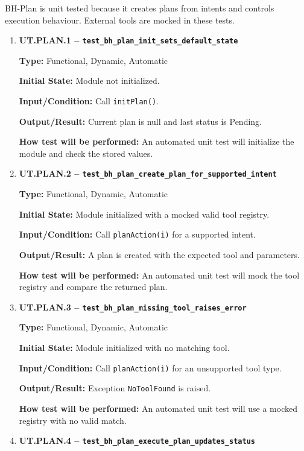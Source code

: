 \documentclass[12pt, titlepage]{article}
\begin{document}
BH-Plan is unit tested because it creates plans from intents and
controls execution behaviour. External tools are mocked in these
tests.

\begin{enumerate}

\item \textbf{UT.PLAN.1 --
\texttt{test\_bh\_plan\_init\_sets\_default\_state}}

\textbf{Type:} Functional, Dynamic, Automatic

\textbf{Initial State:} Module not initialized.

\textbf{Input/Condition:} Call \texttt{initPlan()}.

\textbf{Output/Result:} Current plan is null and last status is Pending.

\textbf{How test will be performed:} An automated unit test will initialize the
module and check the stored values.

\item \textbf{UT.PLAN.2 --
\texttt{test\_bh\_plan\_create\_plan\_for\_supported\_intent}}

\textbf{Type:} Functional, Dynamic, Automatic

\textbf{Initial State:} Module initialized with a mocked valid tool registry.

\textbf{Input/Condition:} Call \texttt{planAction(i)} for a supported intent.

\textbf{Output/Result:} A plan is created with the expected tool and parameters.

\textbf{How test will be performed:} An automated unit test will mock the tool
registry and compare the returned plan.

\item \textbf{UT.PLAN.3 --
\texttt{test\_bh\_plan\_missing\_tool\_raises\_error}}

\textbf{Type:} Functional, Dynamic, Automatic

\textbf{Initial State:} Module initialized with no matching tool.

\textbf{Input/Condition:} Call \texttt{planAction(i)} for an unsupported tool
type.

\textbf{Output/Result:} Exception \texttt{NoToolFound} is raised.

\textbf{How test will be performed:} An automated unit test will use a mocked
registry with no valid match.

\item \textbf{UT.PLAN.4 --
\texttt{test\_bh\_plan\_execute\_plan\_updates\_status}}


\end{enumerate}
\end{document}
